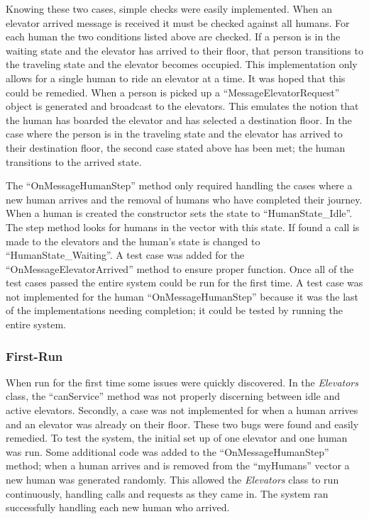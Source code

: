 \documentclass{article}
\begin{document}
Knowing these two cases, simple checks were easily implemented.
When an elevator arrived message is received it must be checked against all humans.
For each human the two conditions listed above are checked.
If a person is in the waiting state and the elevator has arrived to their floor, that person transitions to the traveling state and the elevator becomes occupied.
This implementation only allows for a single human to ride an elevator at a time.
It was hoped that this could be remedied.
When a person is picked up a ``MessageElevatorRequest'' object is generated and broadcast to the elevators.
This emulates the notion that the human has boarded the elevator and has selected a destination floor.
In the case where the person is in the traveling state and the elevator has arrived to their destination floor, the second case stated above has been met; the human transitions to the arrived state.\newline

The ``OnMessageHumanStep'' method only required handling the cases where a new human arrives and the removal of humans who have completed their journey.
When a human is created the constructor sets the state to ``HumanState\_Idle''. 
The step method looks for humans in the vector with this state. 
If found a call is made to the elevators and the human's state is changed to ``HumanState\_Waiting''.
A test case was added for the ``OnMessageElevatorArrived'' method to ensure proper function.
Once all of the test cases passed the entire system could be run for the first time.
A test case was not implemented for the human ``OnMessageHumanStep'' because it was the last of the implementations needing completion; it could be tested by running the entire system.

\subsubsection{First-Run}
When run for the first time some issues were quickly discovered.
In the \textit{Elevators} class, the ``canService'' method was not properly discerning between idle and active elevators.
Secondly, a case was not implemented for when a human arrives and an elevator was already on their floor. 
These two bugs were found and easily remedied.
To test the system, the initial set up of one elevator and one human was run.
Some additional code was added to the ``OnMessageHumanStep'' method; when a human arrives and is removed from the ``myHumans'' vector a new human was generated randomly.
This allowed the \textit{Elevators} class to run continuously, handling calls and requests as they came in.
The system ran successfully handling each new human who arrived.
\end{document}
